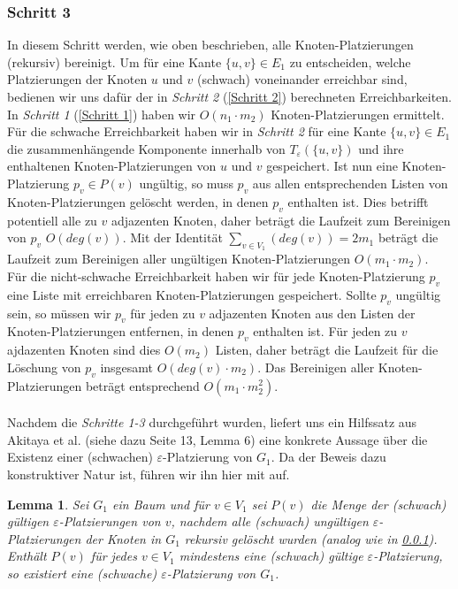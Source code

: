\documentclass[a4paper, 12pt, twoside]{article}
\theoremstyle{Format1} %
\newtheorem{Lem}[Def]{Lemma}                %
\begin{document}
\subsubsection{Schritt 3} \label{Schritt 3}
In diesem Schritt werden, wie oben beschrieben, alle Knoten-Platzierungen (rekursiv) bereinigt.
Um für eine Kante $\{u,v\} \in E_1$ zu entscheiden, welche Platzierungen der Knoten $u$ und $v$ (schwach) voneinander erreichbar sind, bedienen wir uns dafür der in
\textit{Schritt 2} (\ref{Schritt 2}) berechneten Erreichbarkeiten. In \textit{Schritt 1} (\ref{Schritt 1}) haben wir $O(n_1 \cdot m_2)$ Knoten-Platzierungen ermittelt.
Für die schwache Erreichbarkeit haben wir in \textit{Schritt 2} für eine Kante $\{u,v\} \in E_1$ die zusammenhängende Komponente innerhalb von $T_{\varepsilon}(\{u,v\})$
und ihre enthaltenen Knoten-Platzierungen von $u$ und $v$ gespeichert.
Ist nun eine Knoten-Platzierung $p_v \in P(v)$ ungültig, so muss $p_v$ aus allen entsprechenden Listen von Knoten-Platzierungen gelöscht werden, in
denen $p_v$ enthalten ist. Dies betrifft potentiell alle zu $v$ adjazenten Knoten, daher beträgt die Laufzeit zum Bereinigen von $p_v$ $O(deg(v))$.
Mit der Identität $\sum_{v \in V_1}(deg(v)) = 2m_1$ beträgt die Laufzeit zum Bereinigen aller ungültigen Knoten-Platzierungen $O(m_1 \cdot m_2)$.
\\
Für die nicht-schwache Erreichbarkeit haben wir für jede Knoten-Platzierung $p_v$ eine Liste mit erreichbaren Knoten-Platzierungen gespeichert.
Sollte $p_v$ ungültig sein, so müssen wir $p_v$ für jeden zu $v$ adjazenten Knoten aus den Listen der Knoten-Platzierungen entfernen, in denen $p_v$ enthalten ist.
Für jeden zu $v$ ajdazenten Knoten sind dies $O(m_2)$ Listen, daher beträgt die Laufzeit für die Löschung von $p_v$ insgesamt $O(deg(v) \cdot m_2)$.
Das Bereinigen aller Knoten-Platzierungen beträgt entsprechend $O(m_1 \cdot m_2^2)$.
\\
\\
Nachdem die \textit{Schritte 1-3} durchgeführt wurden, liefert uns ein Hilfssatz aus Akitaya et al. \cite{Akitaya} (siehe dazu Seite 13, Lemma 6)
eine konkrete Aussage über die Existenz einer (schwachen) $\varepsilon$-Platzierung von $G_1$. Da der Beweis dazu konstruktiver Natur ist, führen wir ihn
hier mit auf.

\begin{Lem} \label {Lemma 1}
	Sei $G_1$ ein Baum und für $v \in V_1$ sei $P(v)$ die Menge der (schwach) gültigen $\varepsilon$-Platzierungen von $v$, nachdem
	alle (schwach) ungültigen $\varepsilon$-Platzierungen der Knoten in $G_1$ rekursiv gelöscht wurden (analog wie in \ref{Schritt 3}).
	Enthält $P(v)$ für jedes $v \in V_1$ mindestens eine (schwach) gültige $\varepsilon$-Platzierung, so existiert
	eine (schwache) $\varepsilon$-Platzierung von $G_1$.
\end{Lem}
\end{document}
